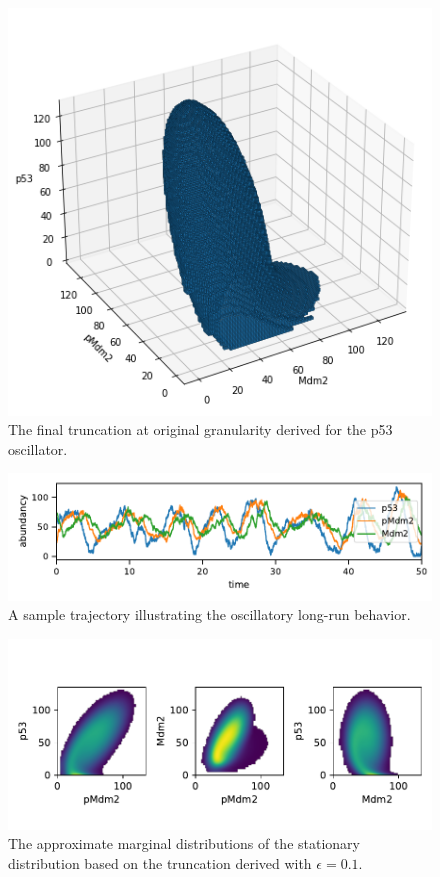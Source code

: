 \begin{figure}
    \centering
    \begin{minipage}{0.9\textwidth}
    \centering
    \includegraphics[width=\textwidth]{gfx/p53_trunc.png}
    \end{minipage}
\caption{The final truncation at original granularity derived for the p53 oscillator.}
\label{fig:p53:trunc}
\end{figure}

\begin{figure}
    \centering
    \includegraphics[width=\textwidth]{gfx/p53_traj.pdf}
    \caption{A sample trajectory illustrating the oscillatory long-run behavior. }
    \label{fig:p53:traj}
\end{figure}

\begin{figure}
    \includegraphics[width=.9\textwidth]{gfx/p53_dist.pdf}
	\caption[approximate marginal distributions of the p53 stationary distribution]{The approximate marginal distributions of the stationary distribution based on the truncation derived with $\epsilon=0.1$.}
\label{fig:p53:dist}
\end{figure}

